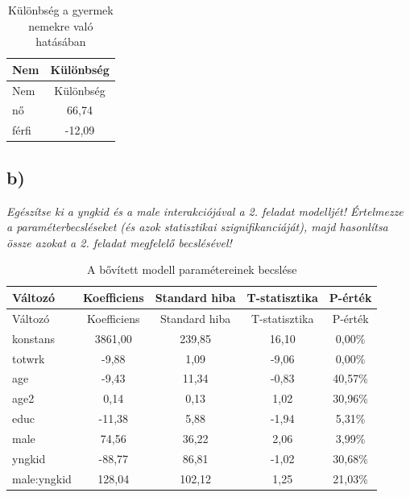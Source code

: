 \documentclass[
]{article}
\newenvironment{Shaded}{\begin{snugshade}}{\end{snugshade}}
\newcommand{\DataTypeTok}[1]{\textcolor[rgb]{0.13,0.29,0.53}{#1}}
\newcommand{\KeywordTok}[1]{\textcolor[rgb]{0.13,0.29,0.53}{\textbf{#1}}}
\newcommand{\NormalTok}[1]{#1}
\newcommand{\OperatorTok}[1]{\textcolor[rgb]{0.81,0.36,0.00}{\textbf{#1}}}
\newcommand{\StringTok}[1]{\textcolor[rgb]{0.31,0.60,0.02}{#1}}
\begin{document}
\begin{longtable}[]{@{}lc@{}}
\caption{Különbség a gyermek nemekre való hatásában}\tabularnewline
\toprule
Nem & Különbség\tabularnewline
\midrule
\endfirsthead
\toprule
Nem & Különbség\tabularnewline
\midrule
\endhead
nő & 66,74\tabularnewline
férfi & -12,09\tabularnewline
\bottomrule
\end{longtable}

\hypertarget{b-2}{%
\subsection{b)}\label{b-2}}

\emph{Egészítse ki a yngkid és a male interakciójával a 2. feladat
modelljét! Értelmezze a paraméterbecsléseket (és azok statisztikai
szignifikanciáját), majd hasonlítsa össze azokat a 2. feladat megfelelő
becslésével!}

\begin{Shaded}
\end{Shaded}

\begin{longtable}[]{@{}lcccc@{}}
\caption{A bővített modell paramétereinek becslése}\tabularnewline
\toprule
Változó & Koefficiens & Standard hiba & T-statisztika &
P-érték\tabularnewline
\midrule
\endfirsthead
\toprule
Változó & Koefficiens & Standard hiba & T-statisztika &
P-érték\tabularnewline
\midrule
\endhead
konstans & 3861,00 & 239,85 & 16,10 & 0,00\%\tabularnewline
totwrk & -9,88 & 1,09 & -9,06 & 0,00\%\tabularnewline
age & -9,43 & 11,34 & -0,83 & 40,57\%\tabularnewline
age2 & 0,14 & 0,13 & 1,02 & 30,96\%\tabularnewline
educ & -11,38 & 5,88 & -1,94 & 5,31\%\tabularnewline
male & 74,56 & 36,22 & 2,06 & 3,99\%\tabularnewline
yngkid & -88,77 & 86,81 & -1,02 & 30,68\%\tabularnewline
male:yngkid & 128,04 & 102,12 & 1,25 & 21,03\%\tabularnewline
\bottomrule
\end{longtable}
\end{document}
